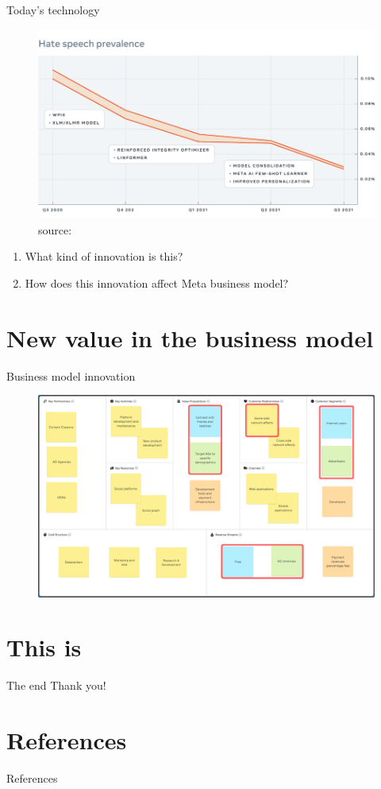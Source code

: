 \documentclass{beamer}
\begin{document}
\begin{frame}{Today's technology}
  \begin{figure}
    \centering
    \includegraphics[width=.8\textwidth]{images/fsl_chart}
    \caption{source: \cite{site:AIart}}
  \end{figure}
\end{frame}

\begin{frame}
  \begin{enumerate}
  \item What kind of innovation is this?
  \item How does this innovation affect Meta business model?
  \end{enumerate}
\end{frame}

\section{New value in the business model}
\begin{frame}{Business model innovation}
  \begin{figure}
    \includegraphics[width=\textwidth]{images/newcanvas.png}
  \end{figure}
\end{frame}

\section*{This is}
\begin{frame}{The end}
\centering Thank you!
\end{frame}

\section*{References}
\begin{frame}{References}
  \printbibliography
\end{frame}
\end{document}
